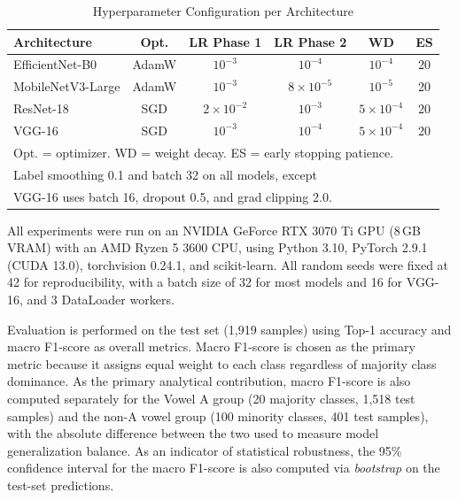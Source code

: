 \documentclass[conference]{IEEEtran}
\begin{document}
\begin{table}[t]
\caption{Hyperparameter Configuration per Architecture}
\label{tab:hyperparam}
\begin{center}
\renewcommand{\arraystretch}{1.2}
\begin{tabular}{lccccc}
\toprule
\textbf{Architecture} & \textbf{Opt.} & \textbf{LR Phase 1} & \textbf{LR Phase 2}
  & \textbf{WD} & \textbf{ES} \\
\midrule
EfficientNet-B0    & AdamW & $10^{-3}$          & $10^{-4}$          & $10^{-4}$ & 20 \\
MobileNetV3-Large  & AdamW & $10^{-3}$          & $8{\times}10^{-5}$ & $10^{-5}$ & 20 \\
ResNet-18          & SGD   & $2{\times}10^{-2}$ & $10^{-3}$          & $5{\times}10^{-4}$ & 20 \\
VGG-16             & SGD   & $10^{-3}$          & $10^{-4}$          & $5{\times}10^{-4}$ & 20 \\
\bottomrule
\multicolumn{6}{l}{\footnotesize Opt. = optimizer. WD = weight decay. ES = early stopping patience.} \\
\multicolumn{6}{l}{\footnotesize Label smoothing 0.1 and batch 32 on all models, except} \\
\multicolumn{6}{l}{\footnotesize VGG-16 uses batch 16, dropout 0.5, and grad clipping 2.0.}
\end{tabular}
\end{center}
\end{table}

All experiments were run on an NVIDIA GeForce RTX 3070 Ti GPU
(8\,GB VRAM) with an AMD Ryzen 5 3600 CPU, using Python 3.10,
PyTorch 2.9.1 (CUDA 13.0), torchvision 0.24.1, and scikit-learn.
All random seeds were fixed at 42 for reproducibility, with a batch
size of 32 for most models and 16 for VGG-16, and 3 DataLoader workers.

Evaluation is performed on the test set (1,919 samples) using
Top-1 accuracy and macro F1-score as overall metrics.
Macro F1-score is chosen as the primary metric because it assigns
equal weight to each class regardless of majority class dominance.
As the primary analytical contribution, macro F1-score is also
computed separately for the Vowel A group (20 majority classes,
1,518 test samples) and the non-A vowel group (100
minority classes, 401 test samples), with the absolute difference
between the two used to measure model generalization balance.
As an indicator of statistical robustness, the 95\% confidence interval
for the macro F1-score is also computed via \textit{bootstrap} on the
test-set predictions.
\end{document}
